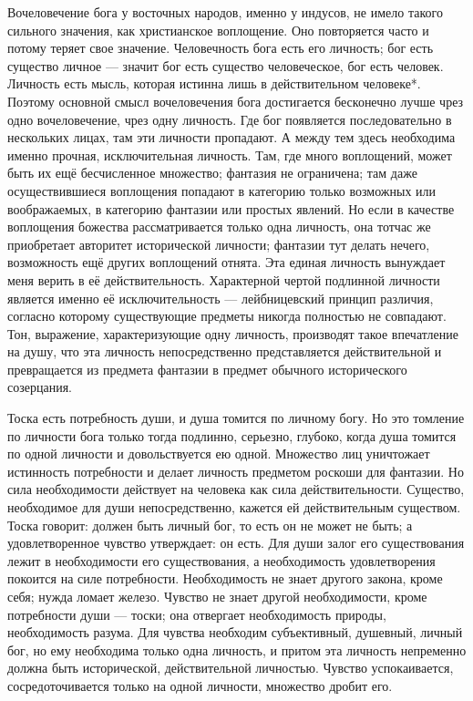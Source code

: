 \documentclass[12pt,oneside]{book}
\begin{document}
Вочеловечение бога у восточных народов, именно у индусов, не имело такого сильного значения, как христианское воплощение. Оно повторяется часто и потому теряет свое значение. Человечность бога есть его личность; бог есть существо личное --- значит бог есть существо человеческое, бог есть человек. Личность есть мысль, которая истинна лишь в действительном человеке*\let\svthefootnote\thefootnote\let\thefootnote\relax{}\let\thefootnote\svthefootnote. Поэтому основной смысл вочеловечения бога достигается бесконечно лучше чрез одно вочеловечение, чрез одну личность. Где бог появляется последовательно в нескольких лицах, там эти личности пропадают. А между тем здесь необходима именно прочная, исключительная личность. Там, где много воплощений, может быть их ещё бесчисленное множество; фантазия не ограничена; там даже осуществившиеся воплощения попадают в категорию только возможных или воображаемых, в категорию фантазии или простых явлений. Но если в качестве воплощения божества рассматривается только одна личность, она тотчас же приобретает авторитет исторической личности; фантазии тут делать нечего, возможность ещё других воплощений отнята. Эта единая личность вынуждает меня верить в её действительность. Характерной чертой подлинной личности является именно её исключительность --- лейбницевский принцип различия, согласно которому существующие предметы никогда полностью не совпадают. Тон, выражение, характеризующие одну личность, производят такое впечатление на душу, что эта личность непосредственно представляется действительной и превращается из предмета фантазии в предмет обычного исторического созерцания.



Тоска есть потребность души, и душа томится по личному богу. Но это томление по личности бога только тогда подлинно, серьезно, глубоко, когда душа томится по одной личности и довольствуется ею одной. Множество лиц уничтожает истинность потребности и делает личность предметом роскоши для фантазии. Но сила необходимости действует на человека как сила действительности. Существо, необходимое для души непосредственно, кажется ей действительным существом. Тоска говорит: должен быть личный бог, то есть он не может не быть; а удовлетворенное чувство утверждает: он есть. Для души залог его существования лежит в необходимости его существования, а необходимость удовлетворения покоится на силе потребности. Необходимость не знает другого закона, кроме себя; нужда ломает железо. Чувство не знает другой необходимости, кроме потребности души --- тоски; она отвергает необходимость природы, необходимость разума. Для чувства необходим субъективный, душевный, личный бог, но ему необходима только одна личность, и притом эта личность непременно должна быть исторической, действительной личностью. Чувство успокаивается, сосредоточивается только на одной личности, множество дробит его.
\end{document}
